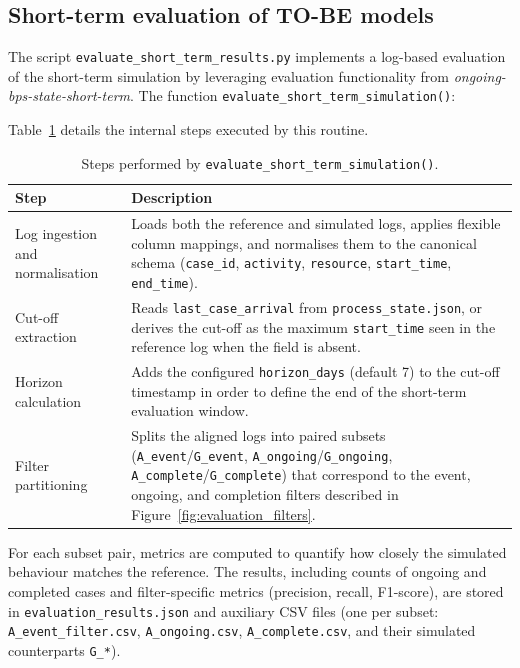 \documentclass[a4paper,fleqn]{cas-sc}
\begin{document}
\subsection{Short-term evaluation of TO-BE models}

The script \verb|evaluate_short_term_results.py| implements a
log-based evaluation of the short-term simulation by leveraging
evaluation functionality from \emph{ongoing-bps-state-short-term}.
The function \verb|evaluate_short_term_simulation()|:

Table~\ref{tbl:evaluation_steps} details the internal steps executed
by this routine.

\begin{table}[width=.95\linewidth,cols=2,pos=t]
\caption{Steps performed by \texttt{evaluate\_short\_term\_simulation()}.}
\label{tbl:evaluation_steps}
\begin{tabular*}{\tblwidth}{@{} p{} p{} @{}}
\toprule
Step & Description \\
\midrule
Log ingestion and normalisation & Loads both the reference and simulated logs, applies flexible column mappings, and normalises them to the canonical schema (\texttt{case\_id}, \texttt{activity}, \texttt{resource}, \texttt{start\_time}, \texttt{end\_time}). \\
Cut-off extraction & Reads \verb|last_case_arrival| from \verb|process_state.json|, or derives the cut-off as the maximum \verb|start_time| seen in the reference log when the field is absent. \\
Horizon calculation & Adds the configured \verb|horizon_days| (default 7) to the cut-off timestamp in order to define the end of the short-term evaluation window. \\
Filter partitioning & Splits the aligned logs into paired subsets (\texttt{A\_event}/\texttt{G\_event}, \texttt{A\_ongoing}/\texttt{G\_ongoing}, \texttt{A\_complete}/\texttt{G\_complete}) that correspond to the event, ongoing, and completion filters described in Figure~\ref{fig:evaluation_filters}. \\
\bottomrule
\end{tabular*}
\end{table}

For each subset pair, metrics are computed to quantify how closely the
simulated behaviour matches the reference.
The results, including counts of ongoing and completed cases
and filter-specific metrics (precision, recall, F1-score),
are stored in \verb|evaluation_results.json| and auxiliary
CSV files (one per subset: \verb|A_event_filter.csv|,
\verb|A_ongoing.csv|, \verb|A_complete.csv|, and their
simulated counterparts \verb|G_*|).
\end{document}
